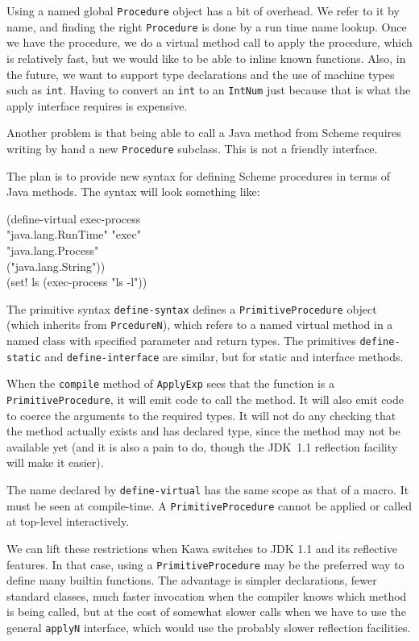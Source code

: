\documentclass[twocolumn]{article}
\newcommand{\Tab}{\>}
\begin{document}
Using a named global {\tt Procedure} object has a bit of overhead.
We refer to it by name, and finding the right {\tt Procedure} is
done by a run time name lookup.  Once we have the procedure,
we do a virtual method call to apply the procedure, which is
relatively fast, but we would like to be able to inline
known functions.  Also, in the future, we want to support type
declarations and the use of machine types such as {\tt int}.
Having to convert an {\tt int} to an {\tt IntNum} just because
that is what the apply interface requires is expensive.

\label{LowProc}
Another problem is that being able to call a Java method
from Scheme requires writing by hand a new {\tt Procedure} subclass.
This is not a friendly interface.

The plan is to provide new syntax for defining Scheme procedures in terms
of Java methods.  The syntax will look something like:

\begin{Code}
(define-virtual exec-process\\
\Tab\Tab "java.lang.RunTime" "exec"\\
\Tab\Tab "java.lang.Process"\\
\Tab\Tab ("java.lang.String"))\\
(set! ls (exec-process "ls -l"))\\
\end{Code}

The primitive syntax {\tt define-syntax} defines a {\tt PrimitiveProcedure}
object (which inherits from {\tt PrcedureN}), which refers to
a named virtual method in a named class with specified
parameter and return types.
The primitives {\tt define-static} and {\tt define-interface}
are similar, but for static and interface methods.

When the {\tt compile} method of {\tt ApplyExp} sees that the function
is a {\tt PrimitiveProcedure}, it will emit code to call the method.
It will also emit code to coerce the arguments to the required types.
It will not do any checking that the method actually exists and
has declared type, since the method may not be available yet
(and it is also a pain to do, though the JDK~1.1 reflection
facility will make it easier).

The name declared by {\tt define-virtual} has the same scope
as that of a macro.  It must be seen at compile-time.
A {\tt PrimitiveProcedure} cannot be applied or called at top-level
interactively.

We can lift these restrictions when Kawa switches
to JDK 1.1 and its reflective features.  In that case, using
a {\tt PrimitiveProcedure} may be the preferred way to define
many builtin functions.  The advantage is simpler declarations,
fewer standard classes, much faster invocation when the compiler
knows which method is being called, but at the cost of somewhat
slower calls when we have to use the general {\tt applyN} interface,
which would use the probably slower reflection facilities.
\end{document}
